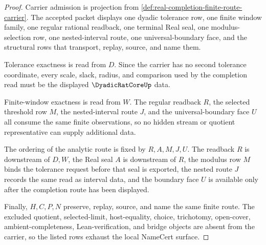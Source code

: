 \begin{proof}
Carrier admission is projection from \autoref{def:real-completion-finite-route-carrier}. The accepted packet displays one dyadic tolerance row, one finite window family, one regular rational readback, one terminal Real seal, one modulus-selection row, one nested-interval route, one universal-boundary face, and the structural rows that transport, replay, source, and name them.

Tolerance exactness is read from $D$. Since the carrier has no second tolerance coordinate, every scale, slack, radius, and comparison used by the completion read must be the displayed $\DyadicRatCoreUp$ data.

Finite-window exactness is read from $W$. The regular readback $R$, the selected threshold row $M$, the nested-interval route $J$, and the universal-boundary face $U$ all consume the same finite observations, so no hidden stream or quotient representative can supply additional data.

The ordering of the analytic route is fixed by $R,A,M,J,U$. The readback $R$ is downstream of $D,W$, the Real seal $A$ is downstream of $R$, the modulus row $M$ binds the tolerance request before that seal is exported, the nested route $J$ records the same read as interval data, and the boundary face $U$ is available only after the completion route has been displayed.

Finally, $H,C,P,N$ preserve, replay, source, and name the same finite route. The excluded quotient, selected-limit, host-equality, choice, trichotomy, open-cover, ambient-completeness, Lean-verification, and bridge objects are absent from the carrier, so the listed rows exhaust the local NameCert surface.
\end{proof}

